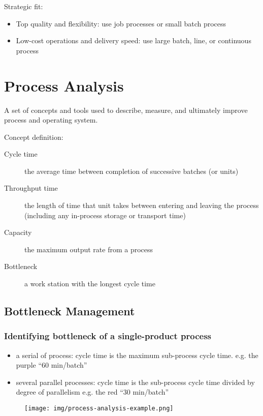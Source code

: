 \documentclass{article}
\begin{document}
Strategic fit:
\begin{itemize}
	\item Top quality and flexibility: use job processes or small batch process
	\item Low-cost operations and delivery speed: use large batch, line, or continuous process
\end{itemize}

\section{Process Analysis}

A set of concepts and tools used to describe, measure,
and ultimately improve process and operating system.

Concept definition:
\begin{description}
	\item[Cycle time] the average time between completion of successive batches (or units)
	\item[Throughput time] the length of time that unit takes between entering
	      and leaving the process (including any in-process storage or transport time)
	\item[Capacity] the maximum output rate from a process
	\item[Bottleneck] a work station with the longest cycle time
\end{description}

\subsection{Bottleneck Management}

\subsubsection{Identifying bottleneck of a single-product process}

\begin{itemize}
	\item a serial of process: cycle time is the maximum sub-process cycle time.
	      e.g. the purple ``60 min/batch''
	\item several parallel processes:
	      cycle time is the sub-process cycle time divided by degree of parallelism e.g. the red ``30 min/batch''
\end{itemize}

\begin{figure}[H]
	\centering
	\texttt{[image: img/process-analysis-example.png]}
\end{figure}
\end{document}
